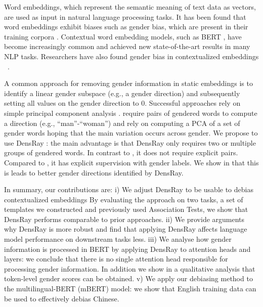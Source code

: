 Word embeddings, which represent the semantic meaning of
text data as vectors, are used as input in natural language
processing tasks. It has been found that word embeddings
exhibit biases such as gender bias, which are present in their training
corpora \cite{bolukbasi2016man,caliskan2017semantics,garg2018word}. Contextual word
embedding models, such as BERT \cite{devlin2018bert}, have
become increasingly common and achieved new state-of-the-art
results in many NLP tasks. Researchers have also found
gender bias in contextualized
embeddings ~\cite{zhao2019gender,may2019measuring}.

A common approach for removing gender information in static
embeddings is to identify a linear gender subspace (e.g., a
gender direction) and subsequently setting all values on the
gender direction to 0. Successful approaches rely on simple
principal component
analysis \cite{bolukbasi2016man,mu2018all}. 
require pairs of gendered words to compute a direction
(e.g., ``man''-``woman'') and  rely on
computing a PCA of a set of gender words hoping that the
main variation occurs across gender. We propose to use
DensRay \cite{dufter2019analytical}: the main advantage is
that DensRay only requires two or multiple groups of
gendered words. In contrast to \cite{bolukbasi2016man}, it
does not require explicit pairs. Compared
to \cite{mu2018all}, it has explicit supervision with gender
labels. We show in  that this is leads to better gender directions identified by 
DensRay.

In summary, our contributions are: 
i) We adjust DensRay to be usable to debias contextualized embeddings
By evaluating the approach on two tasks, a set of templates we constructed and previously used Association Tests, we show that DensRay performs comparable to prior approaches. 
ii) We provide arguments why DensRay is more robust and find that applying DensRay affects language model performance on downstream tasks less.
iii) We analyse how gender information is processed in BERT by applying DensRay to attention heads and layers: we conclude that there is no single attention head responsible for processing gender information. In addition we show in a qualitative analysis that token-level gender scores can be obtained. 
v) We apply our debiasing method to the multilingual-BERT (mBERT) model: we show that English training data can be used to effectively debias Chinese.

